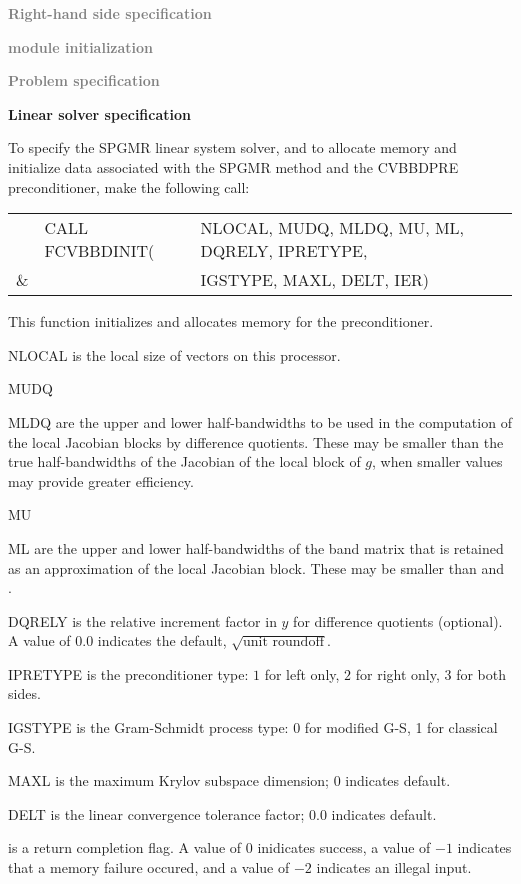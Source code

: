 \begin{Steps}
  
\item \textcolor{gray}{\bf Right-hand side specification}

\item \textcolor{gray}{\bf {\nvector} module initialization}

\item \textcolor{gray}{\bf Problem specification}

\item {\bf Linear solver specification}

  To specify the SPGMR linear system solver, and to allocate memory 
  and initialize data associated with the SPGMR method and the CVBBDPRE
  preconditioner, make the following call:
  {
    \begin{tabular}[t]{@{}r@{}l@{}l@{}}
        &CALL FCVBBDINIT(&NLOCAL, MUDQ, MLDQ, MU, ML, DQRELY, IPRETYPE, \\
      \&&                &IGSTYPE, MAXL, DELT, IER)
    \end{tabular}
  }
  {
    This function initializes and allocates memory for the {\cvbbdpre} preconditioner.
  }
  {
    \begin{args}[IPRETYPE ]
      \item[NLOCAL]
        is the local size of vectors on this processor.
      \item[MUDQ]
      \item[MLDQ]
        are the upper and lower half-bandwidths to be used in the computation
        of the local Jacobian blocks by difference quotients.
        These may be smaller than the true half-bandwidths of the
        Jacobian of the local block of $g$, when smaller values may
        provide greater efficiency.
      \item[MU]
      \item[ML]
        are the upper and lower half-bandwidths of the band matrix that 
        is retained as an approximation of the local Jacobian block.
        These may be smaller than  and .
      \item[DQRELY]
        is the relative increment factor in $y$ for difference quotients (optional). 
        A value of $0.0$ indicates the default, $\sqrt{\text{unit roundoff}}$.
      \item[IPRETYPE]
        is the preconditioner type: $1$ for left only, $2$ for right only, 
        3 for both sides.
      \item[IGSTYPE]
        is the Gram-Schmidt process type: $0$ for modified G-S, 1 for classical G-S.
      \item[MAXL]
        is the maximum Krylov subspace dimension; $0$ indicates default.
      \item[DELT]
        is the linear convergence tolerance factor; $0.0$ indicates default.
    \end{args}
  }
  {
     is a return completion flag.  A value of $0$ inidicates success, a value of
    $-1$ indicates that a memory failure occured, and a value of $-2$ indicates an 
    illegal input.
  }
  {}
  

\end{Steps}
